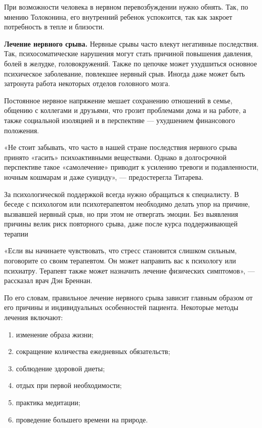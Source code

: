 При возможности человека в нервном перевозбуждении нужно обнять. Так, по мнению Толоконина, его внутренний ребенок успокоится, так как закроет потребность в тепле и близости.

\textbf{Лечение нервного срыва.}
Нервные срывы часто влекут негативные последствия. Так, психосоматические нарушения могут стать причиной повышения давления, болей в желудке, головокружений. Также по цепочке может ухудшиться основное психическое заболевание, повлекшее нервный срыв. Иногда даже может быть затронута работа некоторых отделов головного мозга.

Постоянное нервное напряжение мешает сохранению отношений в семье, общению с коллегами и друзьями, что грозит проблемами дома и на работе, а также социальной изоляцией и в перспективе  ---  ухудшением финансового положения.

«Не стоит забывать, что часто в нашей стране последствия нервного срыва принято «гасить» психоактивными веществами. Однако в долгосрочной перспективе такое «самолечение» приводит к усилению тревоги и подавленности, ночным кошмарам и даже суициду»,  ---  предостерегла Титарева.

\begin{framed}
    \begin{center}
        За психологической поддержкой всегда нужно обращаться к специалисту. В беседе с психологом или психотерапевтом необходимо делать упор на причине, вызвавшей нервный срыв, но при этом не отвергать эмоции. Без выявления причины велик риск повторного срыва, даже после курса поддерживающей терапии
    \end{center}
\end{framed}

«Если вы начинаете чувствовать, что стресс становится слишком сильным, поговорите со своим терапевтом. Он может направить вас к психологу или психиатру. Терапевт также может назначить лечение физических симптомов»,  ---  рассказал врач Дэн Бреннан.

По его словам, правильное лечение нервного срыва зависит главным образом от его причины и индивидуальных особенностей пациента. Некоторые методы лечения включают:

\begin{enumerate}
    \item изменение образа жизни;
    \item сокращение количества ежедневных обязательств;
    \item соблюдение здоровой диеты;
    \item отдых при первой необходимости;
    \item практика медитации;
    \item проведение большего времени на природе.
\end{enumerate}

